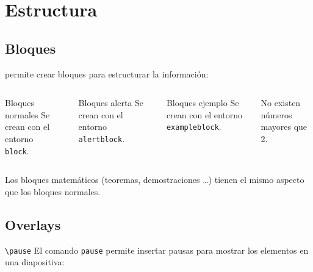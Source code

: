 \section{Estructura}

\subsection{Bloques}

\begin{frame}
  \beamer permite crear bloques para estructurar la información:
  \espacio
  \begin{columns}
      \pause
      \begin{block}{Bloques normales}
        Se crean con el entorno \\ \texttt{block}.
      \end{block}

      \pause
      \begin{alertblock}{Bloques alerta}
        Se crean con el entorno \texttt{alertblock}.
      \end{alertblock}

    \pause
    \begin{exampleblock}{Bloques ejemplo}
      Se crean con el entorno \texttt{exampleblock}.
    \end{exampleblock}

    \pause
    \begin{theorem}
      No existen números mayores que 2.
    \end{theorem}

  \end{columns}

  \pause
  \espacio
  Los bloques matemáticos (teoremas, demostraciones \dots) tienen el mismo aspecto
  que los bloques normales.
\end{frame}

\subsection{Overlays}

\begin{frame}[fragile]{\texttt{\textbackslash pause}}
  El comando \texttt{pause} permite insertar pausas para mostrar los elementos en
  una diapositiva:

  \espacio
  \begin{columns}
  \end{columns}
\end{frame}

